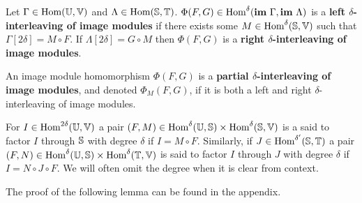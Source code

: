 \begin{definition}
  Let $\Gamma\in\Hom(\U,\V)$ and $\Lambda\in\Hom(\S,\T)$.
  $\Phi(F, G)\in\Hom^\delta(\im~\Gamma,\im~\Lambda)$ is a \textbf{left $\delta$-interleaving of image modules} if there exists some $M\in\Hom^\delta(\S,\V)$ such that $\Gamma[2\delta] = M\circ F$.
  If $\Lambda[2\delta] = G\circ M$ then $\Phi(F, G)$ is a \textbf{right $\delta$-interleaving of image modules}.

  An image module homomorphism $\Phi(F, G)$ is a \textbf{partial $\delta$-interleaving of image modules}, and denoted $\Phi_M(F, G)$, if it is both a left and right $\delta$-interleaving of image modules.
\end{definition}

For $I\in\Hom^{2\delta}(\U,\V)$ a pair $(F, M)\in \Hom^\delta(\U,\S)\times\Hom^\delta(\S,\V)$ is a said to factor $I$ through $\S$ with degree $\delta$ if $I = M\circ F$.
Similarly, if $J\in\Hom^{\delta'}(\S,\T)$ a pair $(F,N)\in\Hom^\delta(\U,\S)\times\Hom^\delta(\T,\V)$ is said to factor $I$ through $J$ with degree $\delta$ if $I = N\circ J\circ F$.
We will often omit the degree when it is clear from context.

The proof of the following lemma can be found in the appendix.


